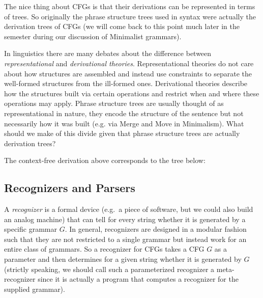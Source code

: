 The nice thing about CFGs is that their derivations can be represented in terms of trees.
So originally the phrase structure trees used in syntax were actually the derivation trees of CFGs (we will come back to this point much later in the semester during our discussion of Minimalist grammars).
%
\begin{exercise}
    In linguistics there are many debates about the difference between \emph{representational} and \emph{derivational theories}.
    Representational theories do not care about how structures are assembled and instead use constraints to separate the well-formed structures from the ill-formed ones.
    Derivational theories describe how the structures built via certain operations and restrict when and where these operations may apply.
    Phrase structure trees are usually thought of as representational in nature, they encode the structure of the sentence but not necessarily how it was built (e.g. via Merge and Move in Minimalism).
    What should we make of this divide given that phrase structure trees are actually derivation trees?
\end{exercise}
%
\begin{examplebox}
    The context-free derivation above corresponds to the tree below:
    \begin{center}
    \end{center}
\end{examplebox}

\subsection{Recognizers and Parsers}
\label{sub:BigPicture_Parsing}
A \emph{recognizer} is a formal device (e.g.\ a piece of software, but we could also build an analog machine) that can tell for every string whether it is generated by a specific grammar $G$.
In general, recognizers are designed in a modular fashion such that they are not restricted to a single grammar but instead work for an entire class of grammars.
So a recognizer for CFGs takes a CFG $G$ as a parameter and then determines for a given string whether it is generated by $G$ (strictly speaking, we should call such a parameterized recognizer a meta-recognizer since it is actually a program that computes a recognizer for the supplied grammar).

